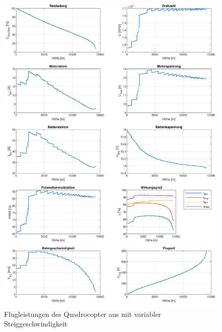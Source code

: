 \begin{figure}[htb!]
\centering
	\includegraphics[scale=0.7]{Diagramme/Russland_vvar.pdf}
	\caption{Flugleistungen des Quadrocopter aus \cite{Anderson.2018} mit variabler Steiggeschwindigkeit}
	\label{abb:russland_vvar}
\end{figure}




